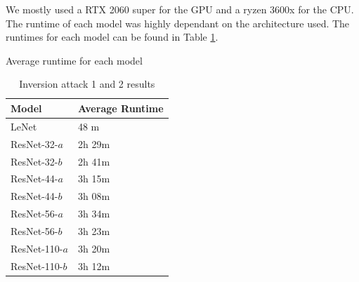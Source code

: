 We mostly used a RTX 2060 super for the GPU and a ryzen 3600x for the CPU. The runtime of each model was highly dependant on the architecture used. The runtimes for each model can be found in Table \ref{runtime-table}.


\begin{table}[!htb]
    \begin{minipage}{.5\linewidth}
    \setlength{\abovecaptionskip}{5pt}
    \caption{Average runtime for each model}
    \centering
  
    \begin{tabular}{l||l}
    \hline
    \textbf{Model} & \textbf{Average Runtime} \\
    \hline
    LeNet & 48 m \\
    ResNet-32-$a$ & 2h 29m \\
    ResNet-32-$b$ & 2h 41m \\
    ResNet-44-$a$ & 3h 15m \\
    ResNet-44-$b$ & 3h 08m \\
    ResNet-56-$a$ & 3h 34m \\
    ResNet-56-$b$ & 3h 23m \\
    ResNet-110-$a$ & 3h 20m \\
    ResNet-110-$b$ & 3h 12m \\
    \end{tabular}
    
    \label{runtime-table}
        
    \end{minipage}%
    \begin{minipage}{.5\linewidth}
    
    \centering
    \setlength{\abovecaptionskip}{5pt}
    \caption{Inversion attack 1 and 2 results}
\end{minipage}
\end{table}
